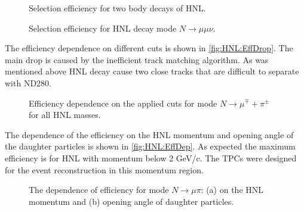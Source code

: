 \documentclass[../main.tex]{subfiles}
\begin{document}
\begin{figure}[!ht]
  \begin{minipage}{0.49\linewidth}
  \end{minipage}
  \hfill
  \begin{minipage}{0.49\linewidth}
  \end{minipage}
  \caption{Selection efficiency for two body decays of HNL.}
  \label{fig:HNL:Eff1}
\end{figure}

\begin{figure}[!ht]
  \caption{Selection efficiency for HNL decay mode $N\to\mu\mu\nu$.}
  \label{fig:HNL:Eff2}
\end{figure}

The efficiency dependence on different cuts is shown in \autoref{fig:HNL:EffDrop}. The main drop is caused by the inefficient track matching algorithm. As was mentioned above HNL decay cause two close tracks that are difficult to separate with ND280.

\begin{figure}[!ht]
  \caption{Efficiency dependence on the applied cuts for mode $N\to\mu^\mp+\pi^\pm$ for all HNL masses.}
  \label{fig:HNL:EffDrop}
\end{figure}

The dependence of the efficiency on the HNL momentum and opening angle of the daughter particles is shown in \autoref{fig:HNL:EffDep}. As expected the maximum efficiency is for HNL with momentum below 2 GeV/c. The TPCs were designed for the event reconstruction in this momentum region.
\begin{figure}[!ht]
  \begin{minipage}{0.49\linewidth}
  \end{minipage}
  \hfill
  \begin{minipage}{0.49\linewidth}
  \end{minipage}
  \caption{The dependence of efficiency for mode $N\to\mu\pi$: (a) on the HNL momentum and (b) opening angle of daughter particles.}
  \label{fig:HNL:EffDep}
\end{figure}
\end{document}
